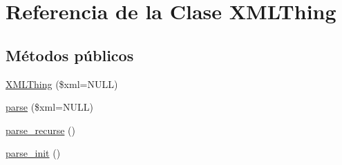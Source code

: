 \hypertarget{classXMLThing}{\section{\-Referencia de la \-Clase \-X\-M\-L\-Thing}
\label{classXMLThing}
}
\subsection*{\-Métodos públicos}
\begin{DoxyCompactItemize}
\item 
\hyperlink{classXMLThing_a1c153caf15cb3b1a2159d5e879a3f6ca}{\-X\-M\-L\-Thing} (\$xml=\-N\-U\-L\-L)
\item 
\hyperlink{classXMLThing_a8d408058141c8a030b433b2deb822baf}{parse} (\$xml=\-N\-U\-L\-L)
\item 
\hyperlink{classXMLThing_ae18a74c5d5979c699b42b1f9a8fedbba}{parse\-\_\-recurse} ()
\item 
\hyperlink{classXMLThing_aa5d425088bd74ca4f3f9c1a9bc9ac453}{parse\-\_\-init} ()
\end{DoxyCompactItemize}
